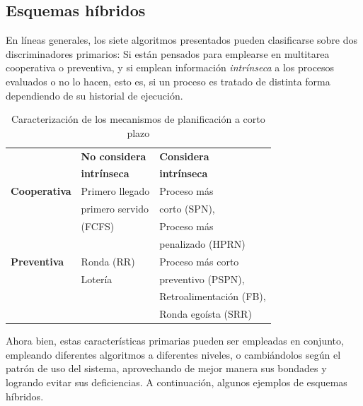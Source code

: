 \documentclass[11pt,fleqn]{book} %
\begin{document}
\subsection{Esquemas híbridos}
\label{sec-4-2-8}


En líneas generales, los siete algoritmos presentados pueden
clasificarse sobre dos discriminadores primarios: Si están pensados
para emplearse en multitarea cooperativa o preventiva, y si emplean
información \emph{intrínseca} a los procesos evaluados o no lo hacen, esto
es, si un proceso es tratado de distinta forma dependiendo de su
historial de ejecución.

\begin{table}[htb]
\caption{Caracterización de los mecanismos de planificación a corto plazo} 
\begin{center}
\begin{tabular}{lll}
\hline
                       &  \textbf{No considera}  &  \textbf{Considera}       \\
                       &  \textbf{intrínseca}    &  \textbf{intrínseca}      \\
\hline
 \textbf{Cooperativa}  &  Primero llegado        &  Proceso más              \\
                       &  primero servido        &  corto (SPN),             \\
                       &  (FCFS)                 &  Proceso más              \\
                       &                         &  penalizado (HPRN)        \\
\hline
 \textbf{Preventiva}   &  Ronda (RR)             &  Proceso más corto        \\
                       &  Lotería                &  preventivo (PSPN),       \\
                       &                         &  Retroalimentación (FB),  \\
                       &                         &  Ronda egoísta (SRR)      \\
\hline
\end{tabular}
\end{center}
\end{table}


Ahora bien, estas características primarias pueden ser empleadas en
conjunto, empleando diferentes algoritmos a diferentes niveles, o
cambiándolos según el patrón de uso del sistema, aprovechando de mejor
manera sus bondades y logrando evitar sus deficiencias. A
continuación, algunos ejemplos de esquemas híbridos.
\end{document}
